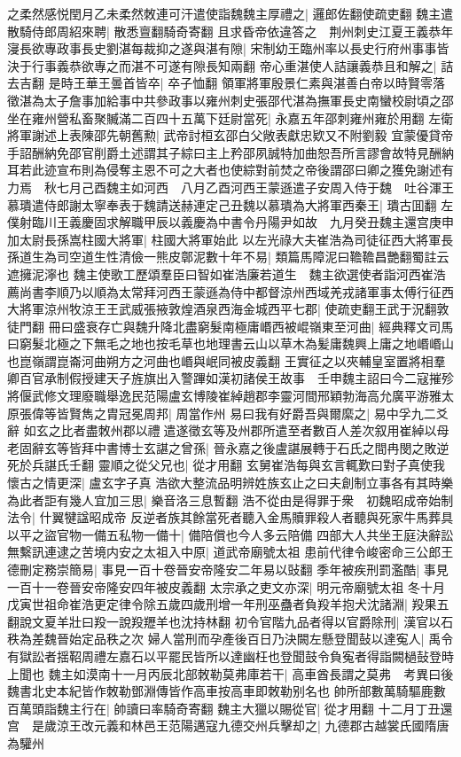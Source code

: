 之柔然感悦閏月乙未柔然敇連可汗遣使詣魏魏主厚禮之|{
	邏郎佐翻使疏吏翻}
魏主遣散騎侍郎周紹來聘|{
	散悉亶翻騎奇寄翻}
且求昏帝依違答之　荆州刺史江夏王義恭年寖長欲專政事長史劉湛每裁抑之遂與湛有隙|{
	宋制幼王臨州率以長史行府州事事皆決于行事義恭欲專之而湛不可遂有隙長知兩翻}
帝心重湛使人詰讓義恭且和解之|{
	詰去吉翻}
是時王華王曇首皆卒|{
	卒子恤翻}
領軍將軍殷景仁素與湛善白帝以時賢零落徵湛為太子詹事加給事中共參政事以雍州刺史張邵代湛為撫軍長史南蠻校尉頃之邵坐在雍州營私畜聚贓滿二百四十五萬下廷尉當死|{
	永嘉五年邵刺雍州雍於用翻}
左衛將軍謝述上表陳邵先朝舊勲|{
	武帝討桓玄邵白父敞表獻忠欵又不附劉毅}
宜蒙優貸帝手詔酬納免邵官削爵土述謂其子綜曰主上矜邵夙誠特加曲恕吾所言謬會故特見酬納耳若此迹宣布則為侵奪主恩不可之大者也使綜對前焚之帝後謂邵曰卿之獲免謝述有力焉　秋七月己酉魏主如河西　八月乙酉河西王蒙遜遣子安周入侍于魏　吐谷渾王慕璝遣侍郎謝太寧奉表于魏請送赫連定己丑魏以慕璝為大將軍西秦王|{
	璝古囬翻}
左僕射臨川王義慶固求解職甲辰以義慶為中書令丹陽尹如故　九月癸丑魏主還宫庚申加太尉長孫嵩柱國大將軍|{
	柱國大將軍始此}
以左光祿大夫崔浩為司徒征西大將軍長孫道生為司空道生性清儉一熊皮鄣泥數十年不易|{
	類篇馬障泥曰韂韂昌艷翻蜀註云遮擁泥濘也}
魏主使歌工歷頌羣臣曰智如崔浩廉若道生　魏主欲選使者詣河西崔浩薦尚書李順乃以順為太常拜河西王蒙遜為侍中都督涼州西域羌戎諸軍事太傅行征西大將軍涼州牧涼王王武威張掖敦煌酒泉西海金城西平七郡|{
	使疏吏翻王武于況翻敦徒門翻}
冊曰盛衰存亡與魏升降北盡窮髮南極庸㟭西被崐嶺東至河曲|{
	經典釋文司馬曰窮髮北極之下無毛之地也按毛草也地理書云山以草木為髪庸魏興上庸之地㟭㟭山也崑嶺謂崑崙河曲朔方之河曲也㟭與岷同被皮義翻}
王實征之以夾輔皇室置將相羣卿百官承制假授建天子旌旗出入警蹕如漢初諸侯王故事　壬申魏主詔曰今二寇摧殄將偃武修文理廢職舉逸民范陽盧玄博陵崔綽趙郡李靈河間邢穎勃海高允廣平游雅太原張偉等皆賢雋之胄冠冕周邦|{
	周當作州}
易曰我有好爵吾與爾縻之|{
	易中孚九二爻辭}
如玄之比者盡敇州郡以禮遣遂徵玄等及州郡所遣至者數百人差次叙用崔綽以母老固辭玄等皆拜中書博士玄諶之曾孫|{
	晉永嘉之後盧諶展轉于石氏之間冉閔之敗逆死於兵諶氏壬翻}
靈順之從父兄也|{
	從才用翻}
玄舅崔浩每與玄言輒歎曰對子真使我懷古之情更深|{
	盧玄字子真}
浩欲大整流品明辨姓族玄止之曰夫創制立事各有其時樂為此者詎有幾人宜加三思|{
	樂音洛三息暫翻}
浩不從由是得罪于衆　初魏昭成帝始制法令|{
	什翼犍諡昭成帝}
反逆者族其餘當死者聽入金馬贖罪殺人者聽與死家牛馬葬具以平之盜官物一備五私物一備十|{
	備陪償也今人多云陪備}
四部大人共坐王庭決辭訟無繫訊連逮之苦境内安之太祖入中原|{
	道武帝廟號太祖}
患前代律令峻密命三公郎王德刪定務崇簡易|{
	事見一百十卷晉安帝隆安二年易以䜴翻}
季年被疾刑罰濫酷|{
	事見一百十一卷晉安帝隆安四年被皮義翻}
太宗承之吏文亦深|{
	明元帝廟號太祖}
冬十月戊寅世祖命崔浩更定律令除五歲四歲刑增一年刑巫蠱者負羖羊抱犬沈諸淵|{
	羖果五翻說文夏羊壯曰羖一說羖䍽羊也沈持林翻}
初令官階九品者得以官爵除刑|{
	漢官以石秩為差魏晉始定品秩之次}
婦人當刑而孕產後百日乃決闕左懸登聞鼔以達寃人|{
	禹令有獄訟者揺鞀周禮左嘉石以平罷民皆所以達幽枉也登聞鼓令負寃者得詣闕檛鼔登時上聞也}
魏主如漠南十一月丙辰北部敇勒莫弗庫若干|{
	高車酋長謂之莫弗　考異曰後魏書北史本紀皆作敇勒鄧淵傳皆作高車按高車即敇勒别名也}
帥所部數萬騎驅鹿數百萬頭詣魏主行在|{
	帥讀曰率騎奇寄翻}
魏主大獵以賜從官|{
	從才用翻}
十二月丁丑還宫　是歲涼王改元義和林邑王范陽邁寇九德交州兵擊却之|{
	九德郡古越裳氏國隋唐為驩州}


